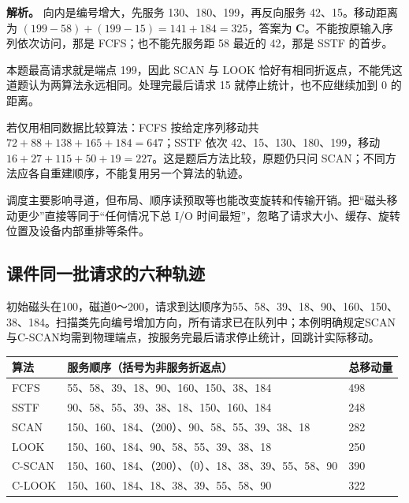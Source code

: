 \textbf{解析。} 向内是编号增大，先服务 130、180、199，再反向服务 42、15。移动距离为 \((199-58)+(199-15)=141+184=325\)，答案为 \textbf{C}。不能按原输入序列依次访问，那是 FCFS；也不能先服务距 58 最近的 42，那是 SSTF 的首步。

本题最高请求就是端点 199，因此 SCAN 与 LOOK 恰好有相同折返点，不能凭这道题认为两算法永远相同。处理完最后请求 15 就停止统计，也不应继续加到 0 的距离。

若仅用相同数据比较算法：FCFS 按给定序列移动共 \(72+88+138+165+184=647\)；SSTF 依次 42、15、130、180、199，移动 \(16+27+115+50+19=227\)。这是题后方法比较，原题仍只问 SCAN；不同方法应各自重建顺序，不能复用另一个算法的轨迹。

调度主要影响寻道，但布局、顺序读预取等也能改变旋转和传输开销。把``磁头移动更少''直接等同于``任何情况下总 I/O 时间最短''，忽略了请求大小、缓存、旋转位置及设备内部重排等条件。

\subsection{课件同一批请求的六种轨迹}\label{OS05-course-disk-traces}

初始磁头在100，磁道0～200，请求到达顺序为55、58、39、18、90、160、150、38、184。扫描类先向编号增加方向，所有请求已在队列中；本例明确规定SCAN与C-SCAN均需到物理端点，按服务完最后请求停止统计，回跳计实际移动。

\par\medskip\noindent\begin{minipage}{\linewidth}\fontsize{9.3}{12}\selectfont\begin{tabularx}{\linewidth}{@{}YYY@{}}
\toprule\noalign{}
算法 & 服务顺序（括号为非服务折返点） & 总移动量 \\
\midrule\noalign{}


FCFS & 55、58、39、18、90、160、150、38、184 & 498 \\
SSTF & 90、58、55、39、38、18、150、160、184 & 248 \\
SCAN & 150、160、184、（200）、90、58、55、39、38、18 & 282 \\
LOOK & 150、160、184、90、58、55、39、38、18 & 250 \\
C-SCAN & 150、160、184、（200）、（0）、18、38、39、55、58、90 & 390 \\
C-LOOK & 150、160、184、18、38、39、55、58、90 & 322 \\
\bottomrule\end{tabularx}
\end{minipage}\par\medskip

